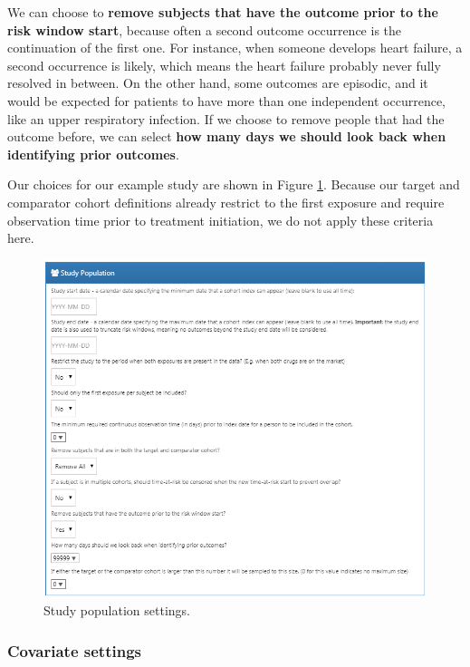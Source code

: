 \documentclass[11pt]{book}
\theoremstyle{definition}
\theoremstyle{definition}
\theoremstyle{definition}
\theoremstyle{remark}
\begin{document}
We can choose to \textbf{remove subjects that have the outcome prior to the risk window start}, because often a second outcome occurrence is the continuation of the first one. For instance, when someone develops heart failure, a second occurrence is likely, which means the heart failure probably never fully resolved in between. On the other hand, some outcomes are episodic, and it would be expected for patients to have more than one independent occurrence, like an upper respiratory infection. If we choose to remove people that had the outcome before, we can select \textbf{how many days we should look back when identifying prior outcomes}.

Our choices for our example study are shown in Figure \ref{fig:studyPopulation}. Because our target and comparator cohort definitions already restrict to the first exposure and require observation time prior to treatment initiation, we do not apply these criteria here.

\begin{figure}

{\centering \includegraphics[width=1\linewidth]{images/PopulationLevelEstimation/studyPopulation} 

}

\caption{Study population settings.}\label{fig:studyPopulation}
\end{figure}

\hypertarget{covariate-settings}{%
\subsubsection*{Covariate settings}\label{covariate-settings}}
\end{document}
